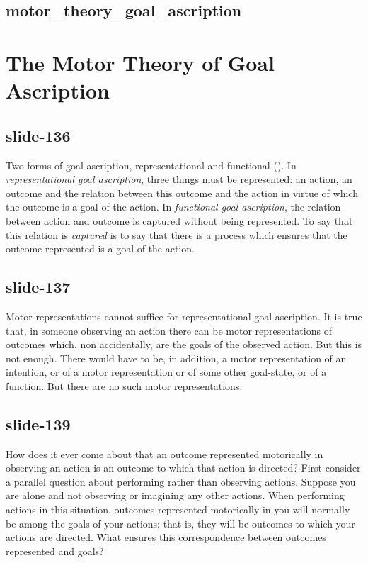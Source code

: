 \documentclass[12pt,\papersize]{extarticle}
\begin{document}
\subsection{motor\_theory\_goal\_ascription}


\section{The Motor Theory of Goal Ascription}


\subsection{slide-136}
Two forms of goal ascription, representational and functional (\citealp{gallese:2011_what}).
In \emph{representational goal ascription}, three things must be represented: an action, an outcome and the relation between this outcome and the action in virtue of which the outcome is a goal of the action.
In \emph{functional goal ascription}, the relation between action and outcome is captured without being represented.
To say that this relation is \emph{captured} is to say that there is a process which ensures that the outcome represented is a goal of the action.

\subsection{slide-137}
Motor representations cannot suffice for representational goal ascription.
It is true that, in someone observing an action there can be motor representations of outcomes which, non accidentally, are the goals of the observed action.
But this is not enough.
There would have to be, in addition, a motor representation of an intention, or of a motor representation or of some other goal-state, or of a function.
But there are no such motor representations.

\subsection{slide-139}
How does it ever come about that an outcome represented motorically in observing an action is an outcome to which that action is directed?
First consider a parallel question about performing rather than observing actions.
Suppose you are alone and not observing or imagining any other actions.
When performing actions in this situation, outcomes represented motorically in you will normally be
among the goals of your actions; that is, they will be outcomes to which your actions are directed.
What ensures this correspondence between outcomes represented and goals?
\end{document}
